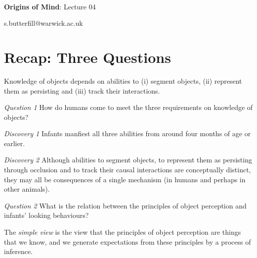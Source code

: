 \documentclass[12pt]{extarticle}
\date{}
\makeatletter
\def \ititle {Origins of Mind}
\def \isubtitle {Lecture 02}
\def \iemail{s.butterfill@warwick.ac.uk}
\makeatother
\begin{document}
\begin{multicols}{3}

\setlength\footnotesep{1em}










\def \ititle {Origins of Mind}
 
\def \isubtitle {Lecture 04}
 
 
 
\
 
 
 
\begin{center}
 
{\Large
 
\textbf{\ititle}: \isubtitle
 
}
 
 
 
\iemail %
 
\end{center}
 
 
 
\section{Recap: Three Questions}
 
Knowledge of objects depends on abilities to (i) segment objects, (ii) represent them as persisting and (iii) track their interactions.
 
\emph{Question 1} How do humans come to meet the three requirements on knowledge of objects?
 
\emph{Discovery 1} Infants manfiest all three abilities from around four months of age or earlier.
 
\emph{Discovery 2} Although abilities to segment objects, to represent them as persisting through occlusion and to track their causal interactions are conceptually distinct, they may all be consequences of a single mechanism (in humans and perhaps in other animals).
 
\emph{Question 2} What is the relation between the principles of object perception and infants’ looking behaviours?
 
The \emph{simple view} is the view that the principles of object perception are things that we know, and we generate expectations from these principles by a process of inference.
 

\end{multicols}
\end{document}
